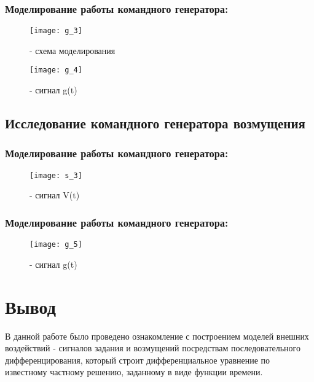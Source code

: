 \subsubsection{Моделирование работы командного генератора:}
\begin{figure}[H]
	\begin{center}
		\texttt{[image: g\_3]}
		\caption{- схема моделирования} 
		\label{pic:pic_1} %
	\end{center}
\end{figure}

\begin{figure}[H]
	\begin{center}
		\texttt{[image: g\_4]}
		\caption{- сигнал g(t)} 
		\label{pic:pic_1} %
	\end{center}
\end{figure}

\newpage

\subsection{Исследование командного генератора возмущения}

\subsubsection{Моделирование работы командного генератора:}
\begin{figure}[H]
	\begin{center}
		\texttt{[image: s\_3]}
		\caption{- сигнал V(t)} 
		\label{pic:pic_1} %
	\end{center}
\end{figure}

\subsubsection{Моделирование работы командного генератора:}
\begin{figure}[H]
	\begin{center}
		\texttt{[image: g\_5]}
		\caption{- сигнал g(t)} 
		\label{pic:pic_1} %
	\end{center}
\end{figure}

\newpage

\section{Вывод}
В данной работе было проведено ознакомление с построением моделей внешних воздействий - сигналов задания и возмущений посредствам последовательного дифференцирования, который строит дифференциальное уравнение по известному частному решению, заданному в виде функции времени.


